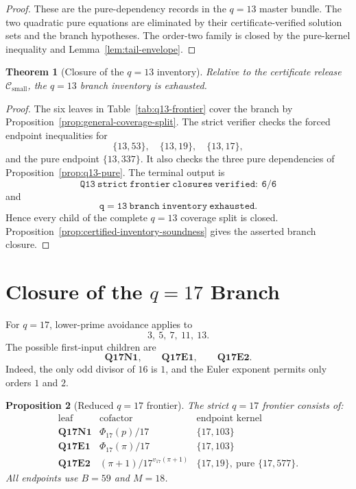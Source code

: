 \documentclass[11pt]{article}
\newtheorem{theorem}{Theorem}[section]
\newtheorem{proposition}[theorem]{Proposition}
\theoremstyle{definition}
\theoremstyle{remark}
\newcommand{\Csmall}{\ensuremath{\mathcal C_{\mathrm{small}}}}
\begin{document}
\begin{proof}
These are the pure-dependency records in the \(q=13\) master bundle.  The two
quadratic pure equations are eliminated by their certificate-verified solution sets and the
branch hypotheses.  The order-two family is closed by the pure-kernel
inequality and Lemma~\ref{lem:tail-envelope}.
\end{proof}

\begin{theorem}[Closure of the \(q=13\) inventory]
\label{thm:q13-closed}
Relative to the certificate release \(\Csmall\), the \(q=13\) branch inventory is
exhausted.
\end{theorem}

\begin{proof}
The six leaves in Table~\ref{tab:q13-frontier} cover the branch by
Proposition~\ref{prop:general-coverage-split}.  The strict verifier checks the
forced endpoint inequalities for
\[
  \{13,53\},\quad \{13,19\},\quad \{13,17\},
\]
and the pure endpoint \(\{13,337\}\).  It also checks the three pure
dependencies of Proposition~\ref{prop:q13-pure}.  The terminal output is
\[
  \mathtt{Q13\ strict\ frontier\ closures\ verified:\ 6/6}
\]
and
\[
  \mathtt{q=13\ branch\ inventory\ exhausted}.
\]
Hence every child of the complete \(q=13\) coverage split is closed.
Proposition~\ref{prop:certified-inventory-soundness} gives the asserted
branch closure.
\end{proof}

\section{Closure of the \(q=17\) Branch}
\label{sec:q17}

For \(q=17\), lower-prime avoidance applies to
\[
  3,\ 5,\ 7,\ 11,\ 13.
\]
The possible first-input children are
\[
  \mathbf{Q17N1},\qquad \mathbf{Q17E1},\qquad \mathbf{Q17E2}.
\]
Indeed, the only odd divisor of \(16\) is \(1\), and the Euler exponent permits
only orders \(1\) and \(2\).

\begin{proposition}[Reduced \(q=17\) frontier]
\label{prop:q17-frontier}
The strict \(q=17\) frontier consists of:
\[
\begin{array}{c|c|c}
\text{leaf} & \text{cofactor} & \text{endpoint kernel}\\
\hline
\mathbf{Q17N1} & \Phi_{17}(p)/17 & \{17,103\}\\
\mathbf{Q17E1} & \Phi_{17}(\pi)/17 & \{17,103\}\\
\mathbf{Q17E2} & (\pi+1)/17^{v_{17}(\pi+1)} & \{17,19\},\ \text{pure }\{17,577\}.
\end{array}
\]
All endpoints use \(B=59\) and \(M=18\).
\end{proposition}
\end{document}

